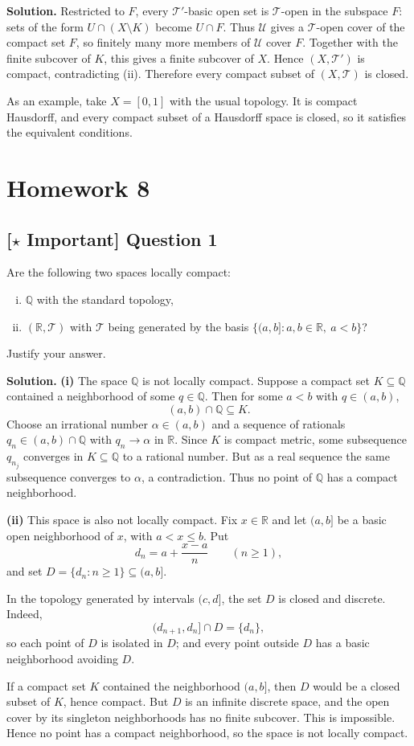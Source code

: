 \documentclass{article}
\newcommand{\R}{\mathbb{R}}
\newcommand{\Q}{\mathbb{Q}}
\newcommand{\important}{\texorpdfstring{\textbf{[\(\star\) Important]}}{[Important]}}
\newenvironment{solution}{\par\noindent\textbf{Solution.}\quad}{\par}
\begin{document}
\begin{solution}
Restricted to $F$, every $\mathcal T'$-basic open set is $\mathcal T$-open
in the subspace $F$: sets of the form $U\cap(X\setminus K)$ become
$U\cap F$. Thus $\mathcal U$ gives a $\mathcal T$-open cover of the compact
set $F$, so finitely many more members of $\mathcal U$ cover $F$. Together
with the finite subcover of $K$, this gives a finite subcover of $X$.
Hence $(X,\mathcal T')$ is compact, contradicting (ii). Therefore every
compact subset of $(X,\mathcal T)$ is closed.

As an example, take $X=[0,1]$ with the usual topology. It is compact
Hausdorff, and every compact subset of a Hausdorff space is closed, so it
satisfies the equivalent conditions.
\end{solution}


\section{Homework 8}

\subsection{\important{} Question 1}
Are the following two spaces locally compact:
\begin{enumerate}[(i)]
  \item $\Q$ with the standard topology,
  \item $(\R, \mathcal{T})$ with $\mathcal{T}$ being generated by the basis $\{(a,b] : a, b \in \R,\ a < b\}$?
\end{enumerate}
Justify your answer.

\begin{solution}
\textbf{(i)} The space $\Q$ is not locally compact. Suppose a compact set
$K\subseteq\Q$ contained a neighborhood of some $q\in\Q$. Then for some
$a<b$ with $q\in(a,b)$,
\[
  (a,b)\cap\Q\subseteq K.
\]
Choose an irrational number $\alpha\in(a,b)$ and a sequence of rationals
$q_n\in(a,b)\cap\Q$ with $q_n\to\alpha$ in $\R$. Since $K$ is compact
metric, some subsequence $q_{n_j}$ converges in $K\subseteq\Q$ to a
rational number. But as a real sequence the same subsequence converges to
$\alpha$, a contradiction. Thus no point of $\Q$ has a compact
neighborhood.

\textbf{(ii)} This space is also not locally compact. Fix $x\in\R$ and
let $(a,b]$ be a basic open neighborhood of $x$, with $a<x\le b$. Put
\[
  d_n=a+\frac{x-a}{n}\qquad(n\ge1),
\]
and set $D=\{d_n:n\ge1\}\subseteq(a,b]$.

In the topology generated by intervals $(c,d]$, the set $D$ is closed and
discrete. Indeed,
\[
  (d_{n+1},d_n]\cap D=\{d_n\},
\]
so each point of $D$ is isolated in $D$; and every point outside $D$ has a
basic neighborhood avoiding $D$.

If a compact set $K$ contained the neighborhood $(a,b]$, then $D$ would be
a closed subset of $K$, hence compact. But $D$ is an infinite discrete
space, and the open cover by its singleton neighborhoods has no finite
subcover. This is impossible. Hence no point has a compact neighborhood,
so the space is not locally compact.
\end{solution}
\end{document}
